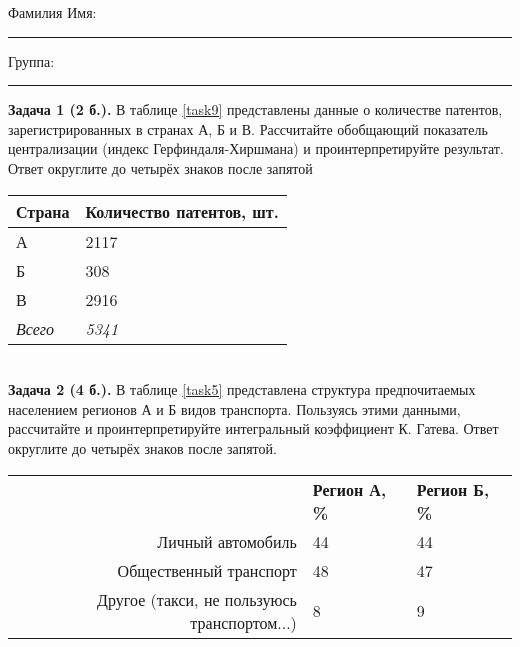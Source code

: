 \documentclass{article}
\begin{document}
\mbox{}

\vspace{-36pt}

\begin{center}
	\begin{tcolorbox}[colback=white, boxrule=0.20ex, sharp corners = all, height=25pt, colframe=black, valign=top]
		\begin{center}
			Фамилия Имя:\hspace{1.5pt}\rule{190pt}{0pt}\hspace{50pt}Группа:\hspace{1.5pt}\rule{60pt}{0pt}
		\end{center}
	\end{tcolorbox}
\end{center}
\vspace{3pt}

\textbf{Задача 1 (2 б.).} В таблице \ref{task9} представлены данные о количестве патентов, зарегистрированных в странах А, Б и В. Рассчитайте обобщающий показатель централизации (индекс Герфиндаля-Хиршмана) и проинтерпретируйте результат. Ответ округлите до четырёх знаков после запятой\\

\begin{minipage}{\textwidth}
\centering
\begin{tabularx}{0.4\textwidth}{YY}
\toprule
\textbf{Страна} & \textbf{Количество патентов, шт.} \\
\midrule
А & 2117 \\

Б & 308 \\

В & 2916 \\
\addlinespace
\textit{Всего} & \textit{5341} \\
\bottomrule
\end{tabularx}
\label{task9}
\end{minipage} \\[35pt]

\textbf{Задача 2 (4 б.).} В таблице \ref{task5} представлена структура предпочитаемых населением регионов А и Б видов транспорта. Пользуясь этими данными, рассчитайте и проинтерпретируйте интегральный коэффициент К. Гатева. Ответ округлите до четырёх знаков после запятой.\\

\begin{minipage}{\textwidth}
\centering
\begin{tabularx}{0.7\textwidth}{rYY}
\toprule
 & \textbf{Регион А, \%} & \textbf{Регион Б, \%} \\
\cmidrule(lr){2-2}\cmidrule(lr){3-3}
Личный автомобиль & 44 & 44 \\

Общественный транспорт & 48 & 47 \\

Другое (такси, не пользуюсь транспортом...) & 8 & 9 \\
\bottomrule
\end{tabularx}
\label{task5}
\end{minipage} \\[35pt]
\end{document}
